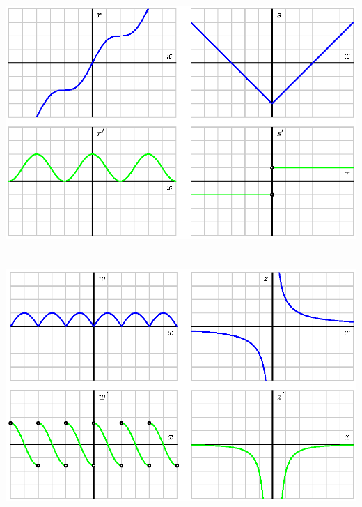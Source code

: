 \begin{activitySolution}
\begin{center}
\includegraphics{figures/1_4_Act1cSoln.eps} \\
\underline{\hspace{4in}}\\
\ \\
\includegraphics{figures/1_4_Act1dSoln.eps}
\end{center}
\end{activitySolution}
\aftera